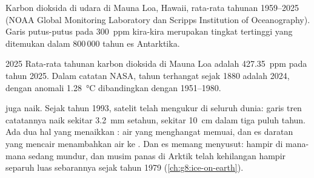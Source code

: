 \begin{omfigure}

{\small Karbon dioksida di udara di Mauna Loa, Hawaii, rata-rata tahunan
1959--2025 (NOAA Global Monitoring Laboratory dan Scripps Institution of
Oceanography). Garis putus-putus pada \qty{300}{ppm} kira-kira merupakan
tingkat tertinggi yang ditemukan dalam 800\,000 tahun es Antarktika.}
\label{fig:g9:climate-past-and-present:co2}
\end{omfigure}

\begin{dated}{2025}
Rata-rata tahunan karbon dioksida di Mauna Loa adalah \qty{427.35}{ppm}
pada tahun 2025. Dalam catatan NASA, tahun terhangat sejak 1880 adalah
2024, dengan anomali \qty{1.28}{\degreeCelsius} dibandingkan dengan
1951--1980.
\end{dated}

 juga naik. Sejak tahun 1993, satelit telah mengukur
  di seluruh dunia: garis tren catatannya naik
sekitar \qty{3.2}{mm} setahun, sekitar \qty{10}{cm} dalam tiga puluh
tahun. Ada dua hal yang menaikkan : air yang menghangat
memuai, dan es daratan yang mencair menambahkan air ke . Dan es
memang menyusut:   hampir di mana-mana sedang mundur,
dan  musim panas di Arktik telah kehilangan hampir separuh luas
sebarannya sejak tahun 1979 (\cref{ch:g8:ice-on-earth}).

